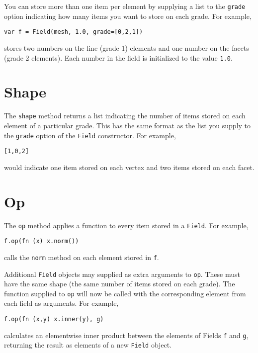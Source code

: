 You can store more than one item per element by supplying a list to the
\texttt{grade} option indicating how many items you want to store on
each grade. For example,

\begin{lstlisting}
var f = Field(mesh, 1.0, grade=[0,2,1])
\end{lstlisting}

stores two numbers on the line (grade 1) elements and one number on the
facets (grade 2 elements). Each number in the field is initialized to
the value \texttt{1.0}.

\hypertarget{shape}{%
\section{Shape}\label{shape}}

The \texttt{shape} method returns a list indicating the number of items
stored on each element of a particular grade. This has the same format
as the list you supply to the \texttt{grade} option of the
\texttt{Field} constructor. For example,

\begin{lstlisting}
[1,0,2]
\end{lstlisting}

would indicate one item stored on each vertex and two items stored on
each facet.

\hypertarget{op}{%
\section{Op}\label{op}}

The \texttt{op} method applies a function to every item stored in a
\texttt{Field}. For example,

\begin{lstlisting}
f.op(fn (x) x.norm())
\end{lstlisting}

calls the \texttt{norm} method on each element stored in \texttt{f}.

Additional \texttt{Field} objects may supplied as extra arguments to
\texttt{op}. These must have the same shape (the same number of items
stored on each grade). The function supplied to \texttt{op} will now be
called with the corresponding element from each field as arguments. For
example,

\begin{lstlisting}
f.op(fn (x,y) x.inner(y), g)
\end{lstlisting}

calculates an elementwise inner product between the elements of Fields
\texttt{f} and \texttt{g}, returning the result as elements of a new
\texttt{Field} object.
